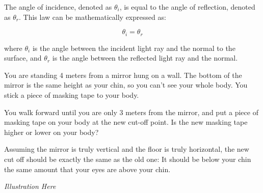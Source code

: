 \begin{mdframed}[style=important, frametitle={Law of Reflection}]

The angle of incidence, denoted as $\theta_i$, is equal to
the angle of reflection, denoted as $\theta_r$. This law can be
mathematically expressed as:

$$\theta_i = \theta_r$$
 
where $\theta_i$ is the angle between the incident light ray and the
normal to the surface, and $\theta_r$ is the angle between the
reflected light ray and the normal.


\end{mdframed}

\begin{Exercise}[title={Law of Reflection}, label=law_of_reflection]

  You are standing 4 meters from a mirror hung on a wall.  The bottom
  of the mirror is the same height as your chin, so you can't see your
  whole body.  You stick a piece of masking tape to your body.

  You walk forward until you are only 3 meters from the mirror, and
  put a piece of masking tape on your body at the new cut-off point.  Is the new
  masking tape higher or lower on your body?
  
\end{Exercise}
\begin{Answer}[ref=law_of_reflection]

 Assuming the mirror is truly vertical and the floor is truly
 horizontal, the new cut off should be exactly the same as the old
 one: It should be below your chin the same amount that your eyes are
 above your chin.

 \textit{Illustration Here}

\end{Answer}

